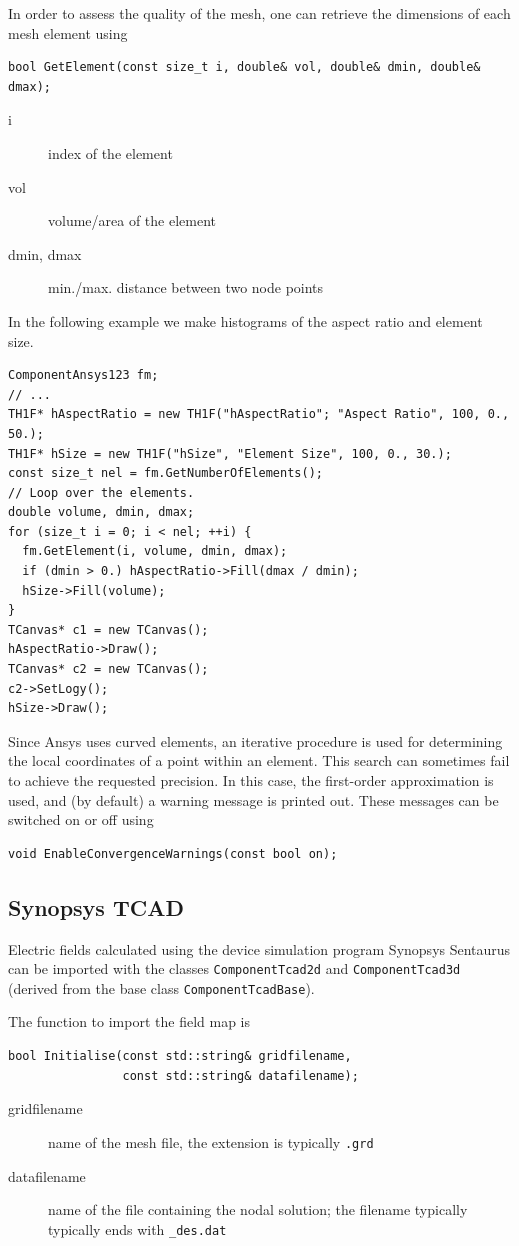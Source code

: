 In order to assess the quality of the mesh, 
one can retrieve the dimensions of each mesh element using
\begin{lstlisting}
bool GetElement(const size_t i, double& vol, double& dmin, double& dmax);
\end{lstlisting}
\begin{description}
\item[i] index of the element
\item[vol] volume/area of the element
\item[dmin, dmax] min./max. distance between two node points
\end{description}

In the following example we make histograms of the aspect ratio and element size.
\begin{lstlisting}
ComponentAnsys123 fm;
// ...
TH1F* hAspectRatio = new TH1F("hAspectRatio"; "Aspect Ratio", 100, 0., 50.);
TH1F* hSize = new TH1F("hSize", "Element Size", 100, 0., 30.);
const size_t nel = fm.GetNumberOfElements();
// Loop over the elements.
double volume, dmin, dmax;
for (size_t i = 0; i < nel; ++i) {
  fm.GetElement(i, volume, dmin, dmax);
  if (dmin > 0.) hAspectRatio->Fill(dmax / dmin);
  hSize->Fill(volume);
}
TCanvas* c1 = new TCanvas();
hAspectRatio->Draw();
TCanvas* c2 = new TCanvas();
c2->SetLogy();
hSize->Draw();
\end{lstlisting}

Since Ansys uses curved elements, an iterative procedure is used for 
determining the local coordinates of a point within an element. 
This search can sometimes fail to achieve the requested precision.
In this case, the first-order approximation is used, and (by default) 
a warning message is printed out. These messages can be switched on or off 
using 
\begin{lstlisting}
void EnableConvergenceWarnings(const bool on);
\end{lstlisting}

\subsection{Synopsys TCAD}

Electric fields calculated using the device simulation program 
Synopsys Sentaurus \cite{Synopsys} can be imported with the classes 
\texttt{ComponentTcad2d} and \texttt{ComponentTcad3d} (derived from 
the base class \texttt{ComponentTcadBase}).

The function to import the field map is 
\begin{lstlisting}
bool Initialise(const std::string& gridfilename,
                const std::string& datafilename);
\end{lstlisting}
\begin{description}
  \item[gridfilename]
  name of the mesh file, the extension is typically \texttt{.grd}
  \item[datafilename]
  name of the file containing the nodal solution;
  the filename typically typically ends with \texttt{\_des.dat}
\end{description}

